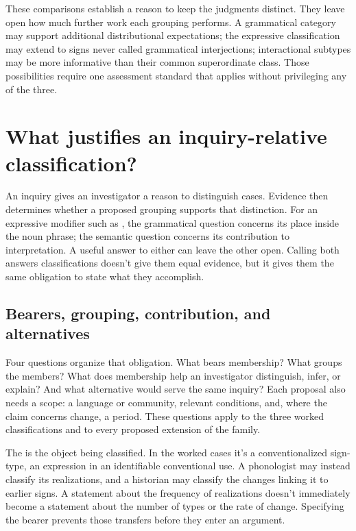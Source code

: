 \documentclass[12pt]{article}
\begin{document}
These comparisons establish a reason to keep the judgments distinct.
They leave open how much further work each grouping performs. A grammatical
category may support additional distributional expectations; the expressive
classification may extend to signs never called grammatical interjections;
interactional subtypes may be more informative than their common superordinate
class. Those possibilities require one assessment standard that applies
without privileging any of the three.


\section{What justifies an inquiry-relative classification?}\label{sec:assessment}

An inquiry gives an investigator a reason to distinguish cases. Evidence then
determines whether a proposed grouping supports that distinction. For an
expressive modifier such as , the grammatical question concerns
its place inside the noun phrase; the semantic question concerns its
contribution to interpretation. A useful answer to either can leave the other
open. Calling both answers classifications doesn't give them equal evidence,
but it gives them the same obligation to state what they accomplish.

\subsection{Bearers, grouping, contribution, and alternatives}

Four questions organize that obligation. What bears membership? What groups
the members? What does membership help an investigator distinguish, infer, or
explain? And what alternative would serve the same inquiry? Each proposal
also needs a scope: a language or community, relevant conditions, and, where
the claim concerns change, a period. These questions apply to the three
worked classifications and to every proposed extension of the family.

The  is the object being classified. In the worked cases it's
a conventionalized sign-type, an expression in an identifiable conventional
use. A phonologist may instead classify its realizations, and a historian
may classify the changes linking it to earlier signs. A statement about the
frequency of realizations doesn't immediately become a statement about the
number of types or the rate of change. Specifying the bearer prevents those
transfers before they enter an argument.
\end{document}
